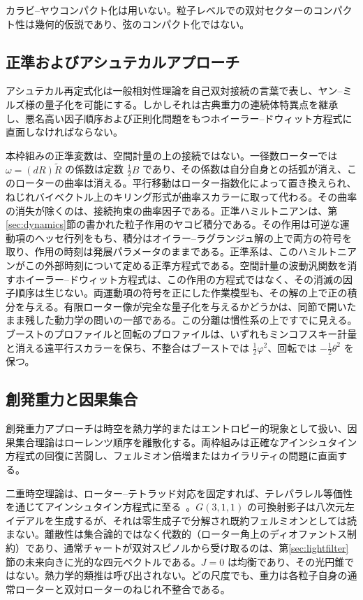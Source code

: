 \documentclass[a4paper]{article}
\begin{document}
カラビ--ヤウコンパクト化は用いない。粒子レベルでの双対セクターのコンパクト性は幾何的仮説であり、弦のコンパクト化ではない。

\subsection{正準およびアシュテカルアプローチ}

アシュテカル再定式化は一般相対性理論を自己双対接続の言葉で表し、ヤン--ミルズ様の量子化を可能にする。しかしそれは古典重力の連続体特異点を継承し、悪名高い因子順序および正則化問題をもつホイーラー--ドウィット方程式に直面しなければならない。

本枠組みの正準変数は、空間計量の上の接続ではない。一径数ローターでは $\omega=(dR)\widetilde R$ の係数は定数 $\tfrac12 B$ であり、その係数は自分自身との括弧が消え、このローターの曲率は消える。平行移動はローター指数化によって置き換えられ、ねじれバイベクトル上のキリング形式が曲率スカラーに取って代わる。その曲率の消失が除くのは、接続拘束の曲率因子である。正準ハミルトニアンは、第\ref{sec:dynamics}節の書かれた粒子作用のヤコビ積分である。その作用は可逆な運動項のヘッセ行列をもち、積分はオイラー--ラグランジュ解の上で両方の符号を取り、作用の時刻は発展パラメータのままである。正準系は、このハミルトニアンがこの外部時刻について定める正準方程式である。空間計量の波動汎関数を消すホイーラー--ドウィット方程式は、この作用の方程式ではなく、その消滅の因子順序は生じない。両運動項の符号を正にした作業模型も、その解の上で正の積分を与える。有限ローター像が完全な量子化を与えるかどうかは、同節で開いたまま残した動力学の問いの一部である。この分離は慣性系の上ですでに見える。ブーストのプロファイルと回転のプロファイルは、いずれもミンコフスキー計量と消える遠平行スカラーを保ち、不整合はブーストでは $\tfrac12\varphi^2$、回転では $-\tfrac12\theta^2$ を保つ。

\subsection{創発重力と因果集合}

創発重力アプローチは時空を熱力学的またはエントロピー的現象として扱い、因果集合理論はローレンツ順序を離散化する。両枠組みは正確なアインシュタイン方程式の回復に苦闘し、フェルミオン倍増またはカイラリティの問題に直面する。

二重時空理論は、ローター–テトラッド対応を固定すれば、テレパラレル等価性を通じてアインシュタイン方程式に至る~\cite{maluf2013}。$G(3,1,1)$ の可換射影子は八次元左イデアルを生成するが、それは零生成子で分解され既約フェルミオンとしては読まない。離散性は集合論的ではなく代数的（ローター角上のディオファントス制約）であり、通常チャートが双対スピノルから受け取るのは、第\ref{sec:lightfilter}節の未来向きに光的な四元ベクトルである。$J=0$ は均衡であり、その光円錐ではない。熱力学的類推は呼び出されない。どの尺度でも、重力は各粒子自身の通常ローターと双対ローターのねじれ不整合である。
\end{document}
